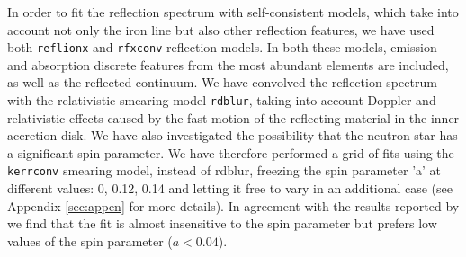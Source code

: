 \documentclass{aa}
\begin{document}
In order to fit the reflection spectrum with self-consistent models,
which take into account not only the iron line but also other 
reflection features, we have used both \texttt{reflionx} and 
\texttt{rfxconv} reflection models. In both these models, emission
and absorption discrete features from the most abundant elements 
are included, as well as the reflected continuum. 
We have convolved the reflection spectrum with the relativistic smearing 
model \texttt{rdblur}, taking into account Doppler and relativistic effects 
caused by the fast motion of the reflecting material in the inner accretion 
disk. We have also investigated the possibility that the neutron star has
a significant spin parameter. We have therefore performed a grid of 
fits using the \texttt{kerrconv} smearing model, instead of rdblur, 
freezing the spin parameter 'a' at different values: 0, 0.12, 0.14 and 
letting it free to vary in an additional case (see Appendix \ref{sec:appen} 
for more details).  
In agreement with the results reported by \citet{Miller.etal:13} 
we find that the fit is almost insensitive to the spin parameter but
prefers low values of the spin parameter ($a < 0.04$).
\end{document}

